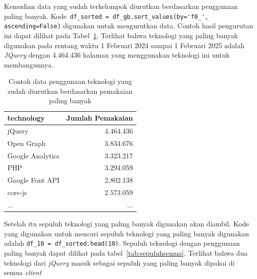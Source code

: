 Kemudian data yang sudah terkelompok diurutkan berdasarkan penggunaan paling banyak. Kode~\verb|df_sorted = df_gb.sort_values(by='f0_', ascending=False)| digunakan untuk mengurutkan data. Contoh hasil pengurutan ini dapat dilihat pada Tabel~\ref{tab:urutgbsample}. Terlihat bahwa teknologi yang paling banyak digunakan pada rentang waktu 1 Februari 2024 sampai 1 Februari 2025 adalah \textit{JQuery} dengan 4.464.436 halaman \web yang menggunakan teknologi ini untuk membangunnya.
\begin{table}[H]
    \centering
    \caption{Contoh data penggunaan teknologi yang sudah diurutkan berdasarkan pemakaian paling banyak}
    \label{tab:urutgbsample}
    \begin{tabular}{|l|r|}
        \hline
        technology & Jumlah Pemakaian \\ \hline
        jQuery & 4.464.436 \\ \hline
        Open Graph & 3.834.676 \\ \hline
        Google Analytics & 3.323.217 \\ \hline
        PHP & 3.294.059 \\ \hline
        Google Font API & 2.802.138 \\ \hline
        core-js & 2.573.059 \\ \hline
        ... & ... \\ \hline
    \end{tabular}
\end{table}

Setelah itu sepuluh teknologi yang paling banyak digunakan akan diambil. Kode yang digunakan untuk mencari sepuluh teknologi yang paling banyak digunakan adalah \verb|df_10 = df_sorted.head(10)|. Sepuluh teknologi dengan penggunaan paling banyak dapat dilihat pada tabel~\ref{tab:sepuluhsemua}. Terlihat bahwa dua teknologi dari \textit{jQuery} masuk sebagai sepuluh yang paling banyak dipakai di semua \textit{client} 

